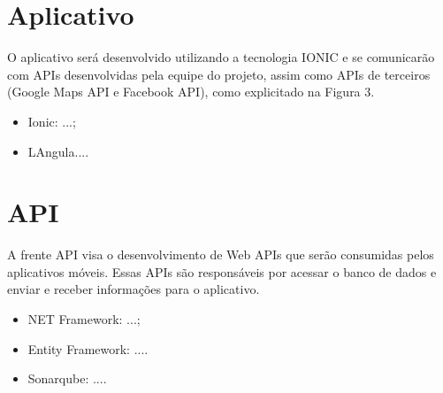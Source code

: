 \documentclass[
    12pt,               %
    openright,          %
    twoside,            %
    a4paper,            %
    openany             %
    draft,              %
    MODELO,             %
    TODO,               %
    english,            %
    brazil              %
    ]{ifsp-spo-inf-ctds}
\begin{document}
\begingroup
\let\clearpage\relax
\chapter{Aplicativo}
\endgroup

O aplicativo será desenvolvido utilizando a tecnologia IONIC e se comunicarão com APIs desenvolvidas pela equipe do projeto, assim como APIs de terceiros (Google Maps API e Facebook API), como explicitado na Figura 3.

\begin{itemize}
\item Ionic: ...;
\item LAngula....
\end{itemize}

\begingroup
\let\clearpage\relax
\chapter{API}
\endgroup

A frente API visa o desenvolvimento de Web APIs que serão consumidas pelos aplicativos móveis. Essas APIs são responsáveis por acessar o banco de dados e enviar e receber informações para o aplicativo.

\begin{itemize}
\item NET Framework: ...;
\item Entity Framework: ....
\item Sonarqube: ....
\end{itemize}



\end{document}
